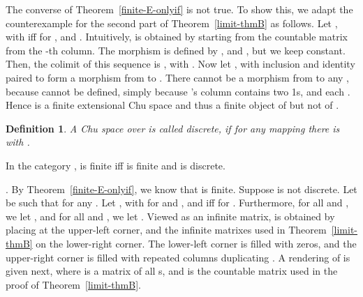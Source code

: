 \documentclass{LMCS}
\let\pf\proof
\newtheorem{defn}{Definition}[section]
\begin{document}
The converse of Theorem~\ref{finite-E-onlyif} is not true.  To show
this, we adapt the counterexample for the second part of
Theorem~\ref{limit-thmB} as follows. Let , with  iff  
for , and . 
Intuitively,  is obtained by starting from the countable
matrix  from the -th column.  The morphism  is defined by , and , but we keep  constant. 
Then, the colimit of this sequence is , with .  Now let ,
with inclusion and identity paired to form a morphism  from
 to .  There cannot be a morphism  from  to any , because  cannot be defined, simply because 's column contains
two 1s, and each . Hence  is a finite extensional Chu
space and thus a finite object of  but not of
. 



\begin{defn}
  A Chu space  over  is called \emph{discrete}, if
  for any mapping  there is  with . 
\end{defn}

\begin{thm}\label{finite-if}
  In the category ,  is finite iff  is
  finite and  is discrete. 
\end{thm}




\pf {\em (Only if)}.  By Theorem~\ref{finite-E-onlyif}, we know that
 is finite.  Suppose  is not discrete.  Let  be such that  for any .  Let , with  for  and , and  iff 
 for . Furthermore, for all
 and , we let , and for all  and , we let .  Viewed as an
infinite matrix,  is obtained by placing  at the upper-left
corner, and the infinite matrixes used in Theorem~\ref{limit-thmB} on
the lower-right corner. The lower-left corner is filled with zeros,
and the upper-right corner is filled with repeated columns duplicating
.  A rendering of  is given next, 
where  is a  matrix of all
s, and  is the countable matrix used in the proof of
Theorem~\ref{limit-thmB}. 
\end{document}
